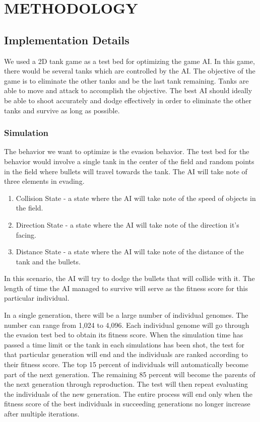 \chapter{METHODOLOGY}
%
%
\section{Implementation Details}
We used a 2D tank game as a test bed for optimizing the game AI. In
this game, there would be several tanks which are controlled by the
AI. The objective of the game is to eliminate the other tanks and be
the last tank remaining.  Tanks are able to move and attack to accomplish
the objective. The best AI should ideally be able to shoot accurately
and dodge effectively in order to eliminate the other tanks and
survive as long as possible. 

\subsection{Simulation}
The behavior we want to optimize is the evasion behavior.  The test bed for the 
behavior would involve a single tank in the center of the field and random points 
in the field where bullets will travel towards the tank.  The AI will take note of
three elements in evading. 

\begin{enumerate}
 \item Collision State - a state where the AI will take note of the speed 
of objects in the field.
 \item Direction State - a state where the AI will take note 
of the direction it's facing.
 \item Distance State - a state where the AI will
take note of the distance of the tank and the bullets.
\end{enumerate}

In this scenario, the AI will try to dodge the bullets that will collide with
it.  The length of time the AI managed to survive will serve as the fitness score
for this particular individual.


In a single generation, there will be a large number of individual genomes. The number
can range from 1,024 to 4,096. Each individual genome will go through the evasion
test bed to obtain its fitness score.  When the simulation time has passed a time 
limit or the tank in each simulations has been shot, the test for that 
particular generation will end and the individuals are ranked according to their fitness
score. The top 15 percent of individuals will automatically become part of the next
generation. The remaining 85 percent will become the parents of the next generation 
through reproduction. The test will then repeat evaluating the individuals of the new
generation. The entire process will end only when the fitness score of the best individuals
in succeeding generations no longer increase after multiple iterations.

